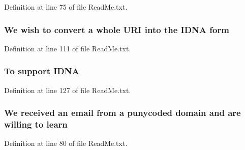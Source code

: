 Definition at line 75 of file Read\+Me.\+txt.

\subsubsection[{\texorpdfstring{form}{form}}]{\setlength{\rightskip}{0pt plus 5cm}We wish to convert {\bf a} whole U\+RI into the {\bf I\+D\+NA} form}\hypertarget{ReadMe_8txt_a4d93093c68b5e8c12de9bf3182195739}{}\label{ReadMe_8txt_a4d93093c68b5e8c12de9bf3182195739}


Definition at line 111 of file Read\+Me.\+txt.

\subsubsection[{\texorpdfstring{I\+D\+NA}{IDNA}}]{\setlength{\rightskip}{0pt plus 5cm}To support I\+D\+NA}\hypertarget{ReadMe_8txt_a5d4f4ee07624e2d22494ccae4cc77d48}{}\label{ReadMe_8txt_a5d4f4ee07624e2d22494ccae4cc77d48}


Definition at line 127 of file Read\+Me.\+txt.

\subsubsection[{\texorpdfstring{learn}{learn}}]{\setlength{\rightskip}{0pt plus 5cm}We received {\bf an} email from {\bf a} punycoded domain and are willing to learn}\hypertarget{ReadMe_8txt_a1d2bfa89fe8b4d0500b8f0b135034594}{}\label{ReadMe_8txt_a1d2bfa89fe8b4d0500b8f0b135034594}


Definition at line 80 of file Read\+Me.\+txt.

